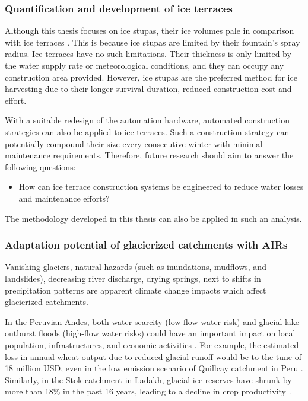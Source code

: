 \subsubsection{Quantification and development of ice terraces}

Although this thesis focuses on ice stupas, their ice volumes pale in comparison with ice terraces
\citep{nusserSociohydrologyArtificialGlaciers2019}. This is because ice stupas are limited by their fountain's
spray radius. Ice terraces have no such limitations. Their thickness is only limited by the water
supply rate or meteorological conditions, and they can occupy any construction area provided. However, ice stupas
are the preferred method for ice harvesting due to their longer survival duration, reduced construction cost and
effort.

With a suitable redesign of the automation hardware, automated construction strategies can also be applied to
ice terraces. Such a construction strategy can potentially compound their size every consecutive winter with
minimal maintenance requirements. Therefore, future research should aim to answer the following
questions:

\begin{itemize}

	\item How can ice terrace construction systems be engineered to reduce water losses and maintenance
	      efforts?

\end{itemize}

The methodology developed in this thesis can also be applied in such an analysis.

\subsubsection{Adaptation potential of glacierized catchments with AIRs}

Vanishing glaciers, natural hazards (such as inundations, mudflows, and landslides), decreasing river discharge,
drying springs, next to shifts in precipitation patterns are apparent climate change impacts which affect
glacierized catchments.

In the Peruvian Andes, both water scarcity (low-flow water risk) and glacial lake outburst floods (high-flow
water risks) could have an important impact on local population, infrastructures, and economic activities
\citep{motschmannIntegratedAssessmentsWater2020}. For example, the estimated loss in annual wheat output due to
reduced glacial runoff would be to the tune of 18 million USD, even in the low emission scenario of Quillcay
catchment in Peru \citep{motschmannLossesDamagesConnected2020}. Similarly, in the Stok catchment in Ladakh,
glacial ice reserves have shrunk by more than 18\% in the past 16 years, leading to a decline in crop
productivity \citep{sohebSpatiotemporalQuantificationKey2022}.


